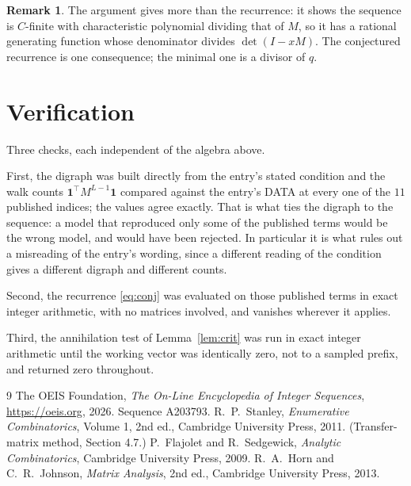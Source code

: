 \documentclass[11pt,a4paper]{article}
\theoremstyle{plain}
\theoremstyle{definition}
\newtheorem{remark}[theorem]{Remark}
\begin{document}
\begin{remark}
The argument gives more than the recurrence: it shows the sequence is $C$-finite with
characteristic polynomial dividing that of $M$, so it has a rational generating function
whose denominator divides $\det(I-xM)$. The conjectured recurrence is one consequence; the
minimal one is a divisor of $q$.
\end{remark}

\section{Verification}

Three checks, each independent of the algebra above.

First, the digraph was built directly from the entry's stated condition and the walk counts
$\mathbf{1}^{\!\top}M^{L-1}\mathbf{1}$ compared against the entry's DATA at
every one of the $11$ published indices; the values agree exactly. That is what ties
the digraph to the sequence: a model that reproduced only some of the published terms would
be the wrong model, and would have been rejected. In particular it is what rules out a
misreading of the entry's wording, since a different reading of the condition gives a
different digraph and different counts.

Second, the recurrence \eqref{eq:conj} was evaluated on those published terms in exact
integer arithmetic, with no matrices involved, and vanishes wherever it applies.

Third, the annihilation test of Lemma~\ref{lem:crit} was run in exact integer arithmetic
until the working vector was identically zero, not to a sampled prefix, and returned zero
throughout.

\begin{thebibliography}{9}
 The OEIS Foundation, \emph{The On-Line Encyclopedia of Integer
Sequences}, \url{https://oeis.org}, 2026. Sequence A203793.
 R.~P.~Stanley, \emph{Enumerative Combinatorics}, Volume 1, 2nd ed.,
Cambridge University Press, 2011. (Transfer-matrix method, Section 4.7.)
 P.~Flajolet and R.~Sedgewick, \emph{Analytic Combinatorics}, Cambridge
University Press, 2009.
 R.~A.~Horn and C.~R.~Johnson, \emph{Matrix Analysis}, 2nd ed., Cambridge
University Press, 2013.
\end{thebibliography}
\end{document}
